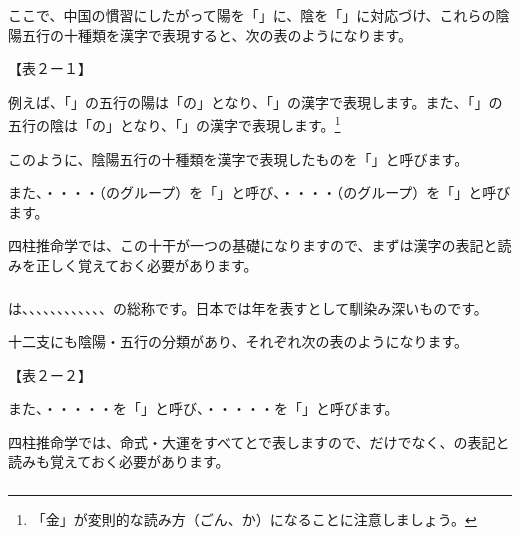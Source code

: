 \documentclass[a4paper,11pt,twocolumn,dvipdfmx]{tarticle}
\begin{document}
ここで、中国の慣習にしたがって陽を「」に、陰を「」に対応づけ、これらの陰陽五行の十種類を漢字で表現すると、次の表のようになります。

【表２ー１】

例えば、「」の五行の陽は「の」となり、「」の漢字で表現します。また、「」の五行の陰は「の」となり、「」の漢字で表現します。\footnote{「金」が変則的な読み方（ごん、か）になることに注意しましょう。}

このように、陰陽五行の十種類を漢字で表現したものを「」と呼びます。

また、・・・・（のグループ）を「」と呼び、・・・・（のグループ）を「」と呼びます。

四柱推命学では、この十干が一つの基礎になりますので、まずは漢字の表記と読みを正しく覚えておく必要があります。


\subsubsection*{}
は、、、、、、、、、、、、の総称です。日本では年を表すとして馴染み深いものです。

十二支にも陰陽・五行の分類があり、それぞれ次の表のようになります。

【表２ー２】

また、・・・・・を「」と呼び、・・・・・を「」と呼びます。

四柱推命学では、命式・大運をすべてとで表しますので、だけでなく、の表記と読みも覚えておく必要があります。


\subsubsection*{}
\end{document}
